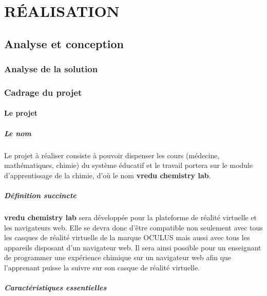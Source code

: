 \part{RÉALISATION}

\chapter{Analyse et conception}

\section{Analyse de la solution}

\section{Cadrage du projet}

\subsection{Le projet}

\subsubsection{Le nom}

Le projet à réaliser consiste à pouvoir dispenser les cours (médecine, mathématiques, chimie)
du système éducatif et le travail portera sur le module d’apprentissage de la chimie, d’où le
nom \textbf{vredu chemistry lab}.

\subsubsection{Définition succincte}

\textbf{vredu chemistry lab} sera développée pour la plateforme de réalité virtuelle et les navigateurs web. Elle se devra donc d’être compatible non seulement avec tous les casques de réalité virtuelle de la marque OCULUS mais aussi avec tous les appareils disposant d’un navigateur web. Il sera ainsi possible pour un enseignant de programmer une expérience chimique sur un navigateur web afin que l'apprenant puisse la suivre sur son casque de réalité virtuelle.

\subsubsection{Caractéristiques essentielles}

